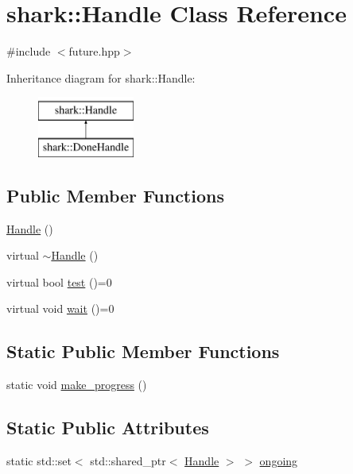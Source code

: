 \hypertarget{classshark_1_1_handle}{}\section{shark\+:\+:Handle Class Reference}
\label{classshark_1_1_handle}


{\ttfamily \#include $<$future.\+hpp$>$}

Inheritance diagram for shark\+:\+:Handle\+:\begin{figure}[H]
\begin{center}
\leavevmode
\includegraphics[height=2.000000cm]{classshark_1_1_handle}
\end{center}
\end{figure}
\subsection*{Public Member Functions}
\begin{DoxyCompactItemize}
\item 
\hyperlink{classshark_1_1_handle_a4e3b97f227b72125e595164e0a6629a7}{Handle} ()
\item 
virtual \hyperlink{classshark_1_1_handle_ad63422289041b1a0fbebae079786ae22}{$\sim$\+Handle} ()
\item 
virtual bool \hyperlink{classshark_1_1_handle_a79ac46bc643e22c2a1fb28d45634fa68}{test} ()=0
\item 
virtual void \hyperlink{classshark_1_1_handle_a36117a898368730a1619a1a771cca424}{wait} ()=0
\end{DoxyCompactItemize}
\subsection*{Static Public Member Functions}
\begin{DoxyCompactItemize}
\item 
static void \hyperlink{classshark_1_1_handle_a2c999eeeb8dd6283b9b792515a10e6aa}{make\+\_\+progress} ()
\end{DoxyCompactItemize}
\subsection*{Static Public Attributes}
\begin{DoxyCompactItemize}
\item 
static std\+::set$<$ std\+::shared\+\_\+ptr$<$ \hyperlink{classshark_1_1_handle}{Handle} $>$ $>$ \hyperlink{classshark_1_1_handle_a0ade8d8ad19d5620c10381a7e26db838}{ongoing}
\end{DoxyCompactItemize}


